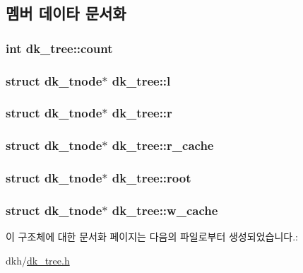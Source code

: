 \subsection{멤버 데이타 문서화}
\hypertarget{structdk__tree_af79ecba1677f82486893accb0859a696}{
\subsubsection[{count}]{\setlength{\rightskip}{0pt plus 5cm}int dk\+\_\+tree\+::count}}\label{structdk__tree_af79ecba1677f82486893accb0859a696}
\hypertarget{structdk__tree_a47101f1a0d29f4be791707a4b4b6477e}{
\subsubsection[{l}]{\setlength{\rightskip}{0pt plus 5cm}struct {\bf dk\+\_\+tnode}$\ast$ dk\+\_\+tree\+::l}}\label{structdk__tree_a47101f1a0d29f4be791707a4b4b6477e}
\hypertarget{structdk__tree_a5d989a0efeadbc970750f1ac8ad4018e}{
\subsubsection[{r}]{\setlength{\rightskip}{0pt plus 5cm}struct {\bf dk\+\_\+tnode}$\ast$ dk\+\_\+tree\+::r}}\label{structdk__tree_a5d989a0efeadbc970750f1ac8ad4018e}
\hypertarget{structdk__tree_ae1a363a68dda726e3010e6766057dbbe}{
\subsubsection[{r\+\_\+cache}]{\setlength{\rightskip}{0pt plus 5cm}struct {\bf dk\+\_\+tnode}$\ast$ dk\+\_\+tree\+::r\+\_\+cache}}\label{structdk__tree_ae1a363a68dda726e3010e6766057dbbe}
\hypertarget{structdk__tree_a6a5c48e2ff2494e10aafd1d0bc9d5992}{
\subsubsection[{root}]{\setlength{\rightskip}{0pt plus 5cm}struct {\bf dk\+\_\+tnode}$\ast$ dk\+\_\+tree\+::root}}\label{structdk__tree_a6a5c48e2ff2494e10aafd1d0bc9d5992}
\hypertarget{structdk__tree_ab968d09f4098a59419b509bce61debcb}{
\subsubsection[{w\+\_\+cache}]{\setlength{\rightskip}{0pt plus 5cm}struct {\bf dk\+\_\+tnode}$\ast$ dk\+\_\+tree\+::w\+\_\+cache}}\label{structdk__tree_ab968d09f4098a59419b509bce61debcb}


이 구조체에 대한 문서화 페이지는 다음의 파일로부터 생성되었습니다.\+:\begin{DoxyCompactItemize}
\item 
dkh/\hyperlink{dk__tree_8h}{dk\+\_\+tree.\+h}\end{DoxyCompactItemize}

